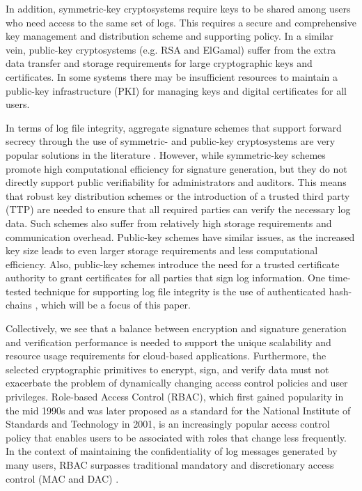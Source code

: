 \documentclass{sig-alternate}
\begin{document}
In addition, symmetric-key cryptosystems require keys to be shared among users who need access to the 
same set of logs. This requires a secure and comprehensive key management and distribution scheme and
supporting policy. In a similar vein, public-key cryptosystems (e.g. RSA and ElGamal) suffer 
from the extra data transfer and storage requirements for large cryptographic keys and certificates. 
In some systems there may be insufficient resources to maintain a public-key infrastructure (PKI) for managing 
keys and digital certificates for all users. 

In terms of log file integrity, aggregate signature schemes that support forward secrecy through the use of 
symmetric- and public-key cryptosystems are very popular solutions in the literature \cite{Yavuz2009-BAF}.
However, while symmetric-key schemes promote high computational efficiency for signature generation, but they 
do not directly support public verifiability for administrators and auditors. This means that robust key 
distribution schemes or the introduction of a trusted third party (TTP) are needed to ensure that all 
required parties can verify the necessary log data. Such schemes also 
suffer from relatively high storage requirements and communication overhead. Public-key 
schemes have similar issues, as the increased key size leads to even larger storage 
requirements and less computational efficiency. Also, public-key schemes introduce the need
for a trusted certificate authority to grant certificates for all parties that sign log information. %
One time-tested technique for supporting log file integrity is the use of authenticated 
hash-chains \cite{Schneier1999-Secure}, which will be a focus of this paper.

Collectively, we see that a balance between encryption and signature generation and verification performance is
needed to support the unique scalability and resource usage requirements for cloud-based applications.
Furthermore, the selected cryptographic primitives to encrypt, sign, and verify data must not exacerbate the
problem of dynamically changing access control policies and user privileges. Role-based Access Control (RBAC),
which first gained popularity in the mid 1990s \cite{Sandhu1996-RBAC} \cite{David1992-RBAC} and was later 
proposed as a standard for the National Institute of Standards and Technology in 2001\cite{Ferraiolo2001-RBAC}, 
is an increasingly popular access control policy that enables users to be associated with roles that change
less frequently. In the context of maintaining the confidentiality of log messages generated by many users,
RBAC surpasses traditional mandatory and discretionary access control (MAC and DAC) 
\cite{Abrams1990-AccessControl}.
\end{document}
